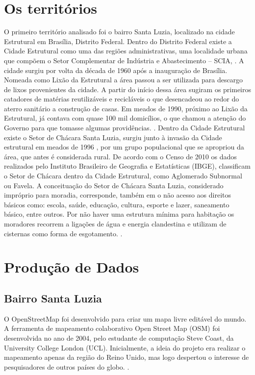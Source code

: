 \section{Os territórios}

O primeiro território analisado foi o bairro Santa Luzia, localizado na cidade Estrutural em Brasília, Distrito Federal.  Dentro do Distrito Federal existe a Cidade Estrutural como uma das regiões administrativas, uma localidade urbana que compõem o Setor Complementar de Indústria e Abastecimento – SCIA, \cite{souza2016nao}.
A cidade surgiu por volta da década de 1960 após a inauguração de Brasília. Nomeada como Lixão da Estrutural a área passou a ser utilizada para descargo de lixos provenientes da cidade. A partir do início dessa área sugiram os primeiros catadores de matérias reutilizáveis e recicláveis o que desencadeou ao redor do aterro sanitário a construção de casas. Em meados de 1990, próximo ao Lixão da Estrutural, já contava com quase 100 mil domicílios, o que chamou a atenção do Governo para que tomasse algumas providências. \cite{souza2016nao}.
Dentro da Cidade Estrutural existe o Setor de Chácara Santa Luzia, surgiu junto à invasão da Cidade estrutural em meados de 1996 , por um grupo populacional que se apropriou da área, que antes é considerada rural. De acordo com o Censo de 2010 os dados realizados pelo Instituto Brasileiro de Geografia e Estatísticas (IBGE), classificam o Setor de Chácara dentro da Cidade Estrutural, como Aglomerado Subnormal ou Favela. \cite{souza2016nao}
A conceituação do Setor de Chácara Santa Luzia, considerado impróprio para moradia, corresponde, também em o não acesso aos direitos básicos como: escola, saúde, educação, cultura, esporte e lazer, saneamento básico, entre outros. Por não haver uma estrutura mínima para habitação os moradores recorrem a ligações de água e energia clandestina e utilizam de cisternas como forma de esgotamento. \cite{souza2016nao}.

\section{Produção de Dados}

\subsection{Bairro Santa Luzia}

O OpenStreetMap foi desenvolvido para criar um mapa livre editável do mundo. A ferramenta de mapeamento colaborativo Open Street Map (OSM) foi desenvolvida no ano de 2004, pelo estudante de computação Steve Coast, da University College London (UCL). Inicialmente, a ideia do projeto era realizar o mapeamento apenas da região do Reino Unido, mas logo despertou o interesse de pesquisadores de outros países do globo. \cite{ramm2011openstreetmap}.

